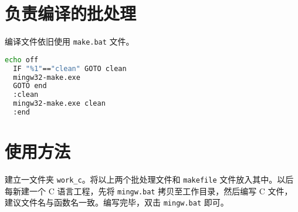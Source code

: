 \documentclass{ctexart}
\begin{document}
\section{负责编译的批处理}

编译文件依旧使用 \texttt{make.bat} 文件。

\begin{lstlisting}[language = bash]
  echo off
  IF "%1"=="clean" GOTO clean
  mingw32-make.exe
  GOTO end
  :clean
  mingw32-make.exe clean
  :end
\end{lstlisting}

\section{使用方法}

建立一文件夹 \texttt{work\_c}。将以上两个批处理文件和 \texttt{makefile} 文件放入其中。以后每新建一个 C 语言工程，先将 \texttt{mingw.bat} 拷贝至工作目录，然后编写 C 文件，建议文件名与函数名一致。编写完毕，双击 \texttt{mingw.bat} 即可。
\end{document}
